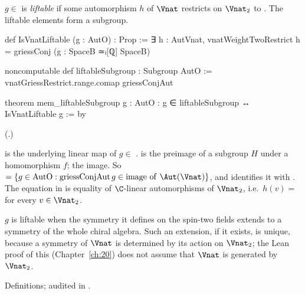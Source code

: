 \begin{definition}\label{ch21:def:liftable}
$g\in$  is \emph{liftable} if some automorphism $h$ of $\Vnat$ restricts on $\Vnat_2$ to
.  The liftable elements form a subgroup.
\end{definition}
\begin{leancode}
def IsVnatLiftable (g : AutO) : Prop :=
  ∃ h : AutVnat, vnatWeightTwoRestrict h = griessConj (g : SpaceB ≃ₗ[ℚ] SpaceB)
\end{leancode}
\begin{leancode}
noncomputable def liftableSubgroup : Subgroup AutO :=
  vnatGriessRestrict.range.comap griessConjAut
\end{leancode}
\begin{leancode}
theorem mem_liftableSubgroup {g : AutO} : g ∈ liftableSubgroup ↔ IsVnatLiftable g := by
\end{leancode}
(.)
\begin{dictionary}
 is the underlying linear map of $g\in$ .
 is the preimage of a subgroup $H$ under a homomorphism $f$;  the image.
So  $=\{g\in\mathrm{AutO}:\mathrm{griessConjAut}\,g\in\mathrm{image\ of}\ \Aut(\Vnat)\}$,
and  identifies it with .  The equation in
 is equality of $\C$-linear automorphisms of $\Vnat_2$, i.e.\ $h(v)=$
 for every $v\in\Vnat_2$.
\end{dictionary}
\begin{physics}
$g$ is liftable when the symmetry it defines on the spin-two fields extends to a symmetry of the whole
chiral algebra.  Such an extension, if it exists, is unique, because a symmetry of $\Vnat$ is determined by
its action on $\Vnat_2$; the Lean proof of this (Chapter~\ref{ch:20}) does not assume that $\Vnat$ is
generated by $\Vnat_2$.
\end{physics}
\begin{status}
Definitions; audited in .
\end{status}

